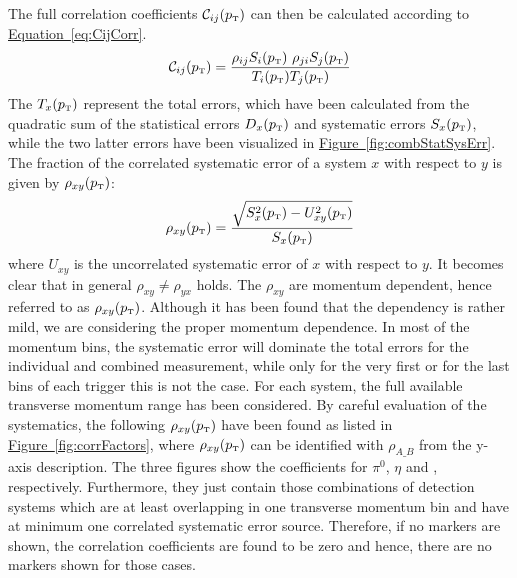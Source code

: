  The full correlation coefficients $\mathcal{C}_{ij}(p_{\text{\tiny T}})$ can then be calculated according to \hyperref[eq:CijCorr]{Equation~\ref*{eq:CijCorr}}.
 			\begin{eqnarray}
 				\mathcal{C}_{ij}(p_{\text{\tiny T}}) = \frac{\rho_{ij} S_i(p_{\text{\tiny T}}) ~\rho_{ji} S_j(p_{\text{\tiny T}})}{T_i(p_{\text{\tiny T}}) T_j(p_{\text{\tiny T}})}
         \label{eq:CijCorr}
 			\end{eqnarray}
%
 The $T_{x}(p_{\text{\tiny T}})$ represent the total errors, which have been calculated from the quadratic sum of the statistical errors $D_x (p_{\text{\tiny T}})$ and systematic errors $S_{x}(p_{\text{\tiny T}})$, while the two latter errors have been visualized in \hyperref[fig:combStatSysErr]{Figure~\ref*{fig:combStatSysErr}}.
 The fraction of the correlated systematic error of a system $x$ with respect to $y$ is given by $\rho_{xy}(p_{\text{\tiny T}})$:
 \begin{equation}
 \rho_{xy}(p_{\text{\tiny T}}) = \frac{\sqrt{S_{x}^{2}(p_{\text{\tiny T}})-U_{xy}^{2}(p_{\text{\tiny T}})}}{S_{x}(p_{\text{\tiny T}})}
 \end{equation}
 where $U_{xy}$ is the uncorrelated systematic error of $x$ with respect to $y$.
 It becomes clear that in general $\rho_{xy}\neq\rho_{yx}$ holds.
 The $\rho_{xy}$ are momentum dependent, hence referred to as $\rho_{xy}(p_{\text{\tiny T}})$.
 Although it has been found that the dependency is rather mild, we are considering the proper momentum dependence.
 In most of the momentum bins, the systematic error will dominate the total errors for the individual and combined measurement, while only for the very first or for the last bins of each trigger this is not the case.
 For each system, the full available transverse momentum range has been considered.
%
 By careful evaluation of the systematics, the following $\rho_{xy}(p_{\text{\tiny T}})$ have been found as listed in \hyperref[fig:corrFactors]{Figure~\ref*{fig:corrFactors}}, where $\rho_{xy}(p_{\text{\tiny T}})$ can be identified with $\rho_{A\_B}$ from the y-axis description. The three figures show the coefficients for $\pi^0$, $\eta$ and \EtaToPi, respectively. Furthermore, they just contain those combinations of detection systems which are at least overlapping in one transverse momentum bin and have at minimum one correlated systematic error source. Therefore, if no markers are shown, the correlation coefficients are found to be zero and hence, there are no markers shown for those cases.
